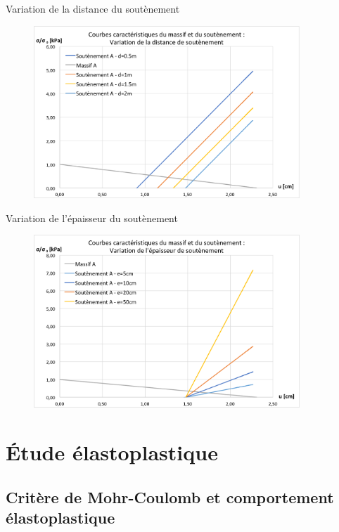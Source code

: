 \documentclass{beamer}
\begin{document}
\begin{frame}{Variation de la distance du soutènement}

\begin{figure}
\centering
\includegraphics[width=10cm]{var_d.png}
\end{figure}

\end{frame}


\begin{frame}{Variation de l'épaisseur du soutènement}

\begin{figure}
\centering
\includegraphics[width=10cm]{var_e.png}
\end{figure}

\end{frame}




\section{Étude élastoplastique}

\subsection{Critère de Mohr-Coulomb et comportement élastoplastique}
\end{document}
